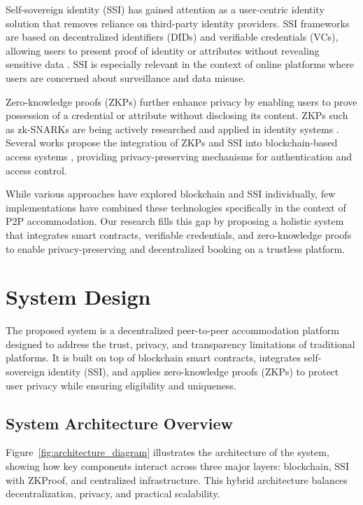 \documentclass[conference]{IEEEtran}
\begin{document}
Self-sovereign identity (SSI) has gained attention as a user-centric identity solution that removes reliance on third-party identity providers. SSI frameworks are based on decentralized identifiers (DIDs) and verifiable credentials (VCs), allowing users to present proof of identity or attributes without revealing sensitive data \cite{wang2019, reed2020, sporny2022}. SSI is especially relevant in the context of online platforms where users are concerned about surveillance and data misuse.

Zero-knowledge proofs (ZKPs) further enhance privacy by enabling users to prove possession of a credential or attribute without disclosing its content. ZKPs such as zk-SNARKs are being actively researched and applied in identity systems \cite{chen2022, dieye2023}. Several works propose the integration of ZKPs and SSI into blockchain-based access systems \cite{moya2023, raipurkar2023}, providing privacy-preserving mechanisms for authentication and access control.

While various approaches have explored blockchain and SSI individually, few implementations have combined these technologies specifically in the context of P2P accommodation. Our research fills this gap by proposing a holistic system that integrates smart contracts, verifiable credentials, and zero-knowledge proofs to enable privacy-preserving and decentralized booking on a trustless platform.

\section{System Design}
The proposed system is a decentralized peer-to-peer accommodation platform designed to address the trust, privacy, and transparency limitations of traditional platforms. It is built on top of blockchain smart contracts, integrates self-sovereign identity (SSI), and applies zero-knowledge proofs (ZKPs) to protect user privacy while ensuring eligibility and uniqueness.

\subsection{System Architecture Overview}
Figure~\ref{fig:architecture_diagram} illustrates the architecture of the system, showing how key components interact across three major layers: blockchain, SSI with ZKProof, and centralized infrastructure. This hybrid architecture balances decentralization, privacy, and practical scalability.
\end{document}
